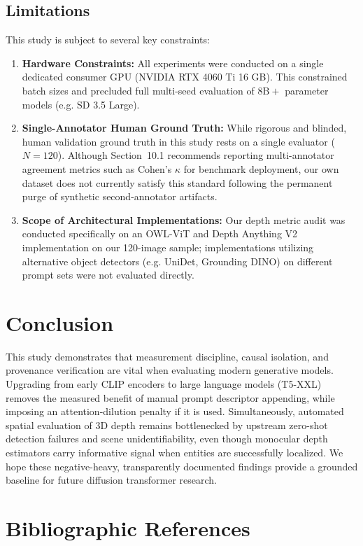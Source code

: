 \documentclass[10pt,twocolumn,letterpaper]{article}
\begin{document}
\subsection{Limitations}
This study is subject to several key constraints:
\begin{enumerate}
    \item \textbf{Hardware Constraints:} All experiments were conducted on a single dedicated consumer GPU (NVIDIA RTX 4060 Ti 16 GB). This constrained batch sizes and precluded full multi-seed evaluation of $8\text{B}+$ parameter models (e.g. SD 3.5 Large).
    \item \textbf{Single-Annotator Human Ground Truth:} While rigorous and blinded, human validation ground truth in this study rests on a single evaluator ($N = 120$). Although Section~10.1 recommends reporting multi-annotator agreement metrics such as Cohen's $\kappa$ for benchmark deployment, our own dataset does not currently satisfy this standard following the permanent purge of synthetic second-annotator artifacts.
    \item \textbf{Scope of Architectural Implementations:} Our depth metric audit was conducted specifically on an OWL-ViT and Depth Anything V2 implementation on our 120-image sample; implementations utilizing alternative object detectors (e.g. UniDet, Grounding DINO) on different prompt sets were not evaluated directly.
\end{enumerate}

\section{Conclusion}

This study demonstrates that measurement discipline, causal isolation, and provenance verification are vital when evaluating modern generative models. Upgrading from early CLIP encoders to large language models (T5-XXL) removes the measured benefit of manual prompt descriptor appending, while imposing an attention-dilution penalty if it is used. Simultaneously, automated spatial evaluation of 3D depth remains bottlenecked by upstream zero-shot detection failures and scene unidentifiability, even though monocular depth estimators carry informative signal when entities are successfully localized. We hope these negative-heavy, transparently documented findings provide a grounded baseline for future diffusion transformer research.

\section*{Bibliographic References}


\end{document}
